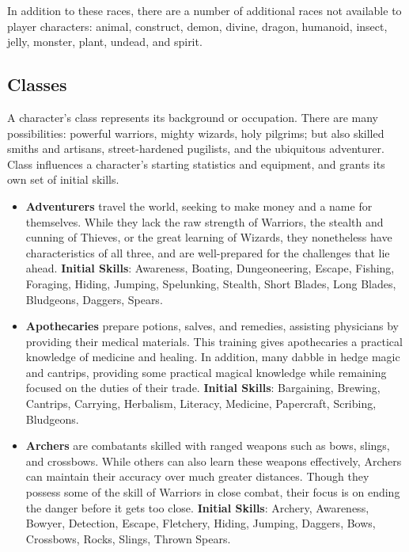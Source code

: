 \documentclass{article}
\begin{document}
In addition to these races, there are a number of additional races not
available to player characters: animal, construct, demon, divine, dragon,
humanoid, insect, jelly, monster, plant, undead, and spirit.

\subsection{Classes}

A character's class represents its background or occupation.  There are
many possibilities: powerful warriors, mighty wizards, holy pilgrims; but
also skilled smiths and artisans, street-hardened pugilists, and the
ubiquitous adventurer.  Class influences a character's starting statistics
and equipment, and grants its own set of initial skills.

\begin{itemize}
\item {\bf Adventurers} travel the world, seeking to make money and a name 
for themselves.  While they lack the raw strength of Warriors, the stealth 
and cunning of Thieves, or the great learning of Wizards, they nonetheless 
have characteristics of all three, and are well-prepared for the challenges
that lie ahead.  \textbf{Initial Skills}: Awareness, Boating, 
Dungeoneering, Escape, Fishing, Foraging, Hiding, Jumping, Spelunking,
Stealth, Short Blades, Long Blades, Bludgeons, Daggers, Spears.

\item {\bf Apothecaries} prepare potions, salves, and remedies, assisting 
physicians by providing their medical materials.  This training gives 
apothecaries a practical knowledge of medicine and healing.  In addition, 
many dabble in hedge magic and cantrips, providing some practical magical 
knowledge while remaining focused on the duties of their trade.  
\textbf{Initial Skills}: Bargaining, Brewing, Cantrips, Carrying,
Herbalism, Literacy, Medicine, Papercraft, Scribing, Bludgeons.

\item {\bf Archers} are combatants skilled with ranged weapons such as 
bows, slings, and crossbows.  While others can also learn these weapons 
effectively, Archers can maintain their accuracy over much greater 
distances.  Though they possess some of the skill of Warriors in close 
combat, their focus is on ending the danger before it gets too close.  
\textbf{Initial Skills}: Archery, Awareness, Bowyer, Detection, Escape,
Fletchery, Hiding, Jumping, Daggers, Bows, Crossbows, Rocks, Slings,
Thrown Spears.


\end{itemize}
\end{document}
